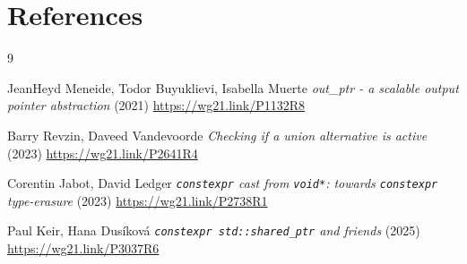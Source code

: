 \documentclass[10pt]{article}
\begin{document}
\section{References}
\renewcommand{\section}[2]{}%
\begin{thebibliography}{9}

    JeanHeyd Meneide, Todor Buyuklievi, Isabella Muerte\newline
    \emph{out\_ptr - a scalable output pointer abstraction} (2021)\newline
    \url{https://wg21.link/P1132R8}

    Barry Revzin, Daveed Vandevoorde\newline
    \emph{Checking if a union alternative is active} (2023)\newline
    \url{https://wg21.link/P2641R4}

    Corentin Jabot, David Ledger\newline
    \emph{\texttt{constexpr} cast from \texttt{void*}: towards \texttt{constexpr} type-erasure} (2023)\newline
    \url{https://wg21.link/P2738R1}

    Paul Keir, Hana Dusíková\newline
    \emph{\texttt{constexpr std::shared\_ptr} and friends} (2025)\newline
    \url{https://wg21.link/P3037R6}


\end{thebibliography}
\end{document}
